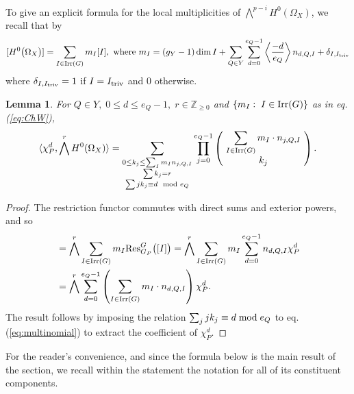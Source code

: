 \documentclass[10pt]{amsart}
\newtheorem{lemma}[theorem]{Lemma}
\theoremstyle{definition}
\begin{document}
To give an explicit formula for the local multiplicities of $\bigwedge^{p-i}H^0(\Omega_X)$, we recall that by \cite[3.9]{MR589254} 
\begin{equation}\label{eq:ChW}
[H^0\big(\Omega_X\big)]=\sum_{I\in{\rm Irr}(G)} m_I[I],
\text{ where }
m_I=(g_Y-1)\dim I+\sum_{Q\in Y}\sum_{d=0}^{e_Q-1}\left\langle \frac{-d}{e_Q}\right\rangle n_{d,Q,I}+\delta_{I,I_{\rm triv}}
\end{equation}
where $\delta_{I,I_{\rm triv}}=1$ if $I=I_{\rm triv}$ and $0$ otherwise.
\begin{lemma}\label{lem:localwedge}
For $Q\in Y,\;0\leq d\leq e_Q-1,\;r\in\mathbb{Z}_{\geq 0}$ and $\{m_I:\;I\in {\rm Irr}(G)\}$ as in eq. (\ref{eq:ChW}),
\[
\langle 
\chi_P^{d}, \bigwedge^{r}H^0(\Omega_X)
\rangle
=
\sum_{\substack{ 0\leq k_j\leq \sum_{I}m_I n_{j,Q,I}  \\ \sum k_j=r \\ \sum jk_j\equiv d\mod e_Q}}
\prod_{j=0}^{e_Q-1}
\left(\!\begin{array}{c} \displaystyle\sum_{I\in{\rm Irr}(G)}m_I\cdot n_{j,Q,I} \\ k_j \end{array}\!\right).
\]
\end{lemma}
\begin{proof}
The restriction functor commutes with direct sums and exterior powers, and so
\begin{align*}
[{\rm Res}^G_{G_P}\big(\bigwedge^{r}H^0(\Omega_X)\big)]
&=
\bigwedge^{r}\sum_{I\in{\rm Irr}(G)} m_I{\rm Res}^G_{G_P}\big([I]\big)
=
\bigwedge^{r}\sum_{I\in{\rm Irr}(G)} m_I\sum_{d=0}^{e_Q-1}n_{d,Q,I}\chi_P^d\\
&=
\bigwedge^{r}\sum_{d=0}^{e_Q-1}\left(\sum_{I\in{\rm Irr}(G)} m_I\cdot n_{d,Q,I}\right)\chi_P^d.
\end{align*}
The result follows by imposing the relation $\sum_{j}j k_j\equiv d\;{\rm mod}\; e_Q$ to eq. (\ref{eq:multinomial}) to extract the coefficient of $\chi_P^d$.
\end{proof}

For the reader’s convenience, and since the formula below is the main result of the section, we recall within the statement the notation for all of its constituent components.
\end{document}
